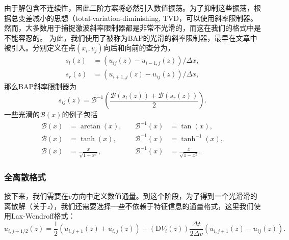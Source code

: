 由于解包含不连续性，因此二阶方案将必然引入数值振荡。为了抑制这些振荡，根据总变差减小的思想（total-variation-diminishing, TVD，可以使用斜率限制器。然而，大多数用于捕捉激波斜率限制器都是非常不光滑的，而这在我们的格式中是不能容忍的。 为此，我们使用了被称为BAP的光滑的斜率限制器，最早在文章中被引入。分别定义在点$(x_i,v_j)$向后和向前的查分为，
\begin{equation}
\begin{aligned}
  s_l(z) &= (u_{ij}(z)-u_{i-1,j}(z))/\Delta x, \\
  s_r(z) &= (u_{i+1,j}(z)-u_{ij}(z))/\Delta x,
\end{aligned}
\end{equation}
那么BAP斜率限制器为
\begin{equation}
  s_{ij}(z)=\mathcal{B}^{-1}\left(\frac{\mathcal{B}(s_l(z))+\mathcal{B}(s_r(z))}{2}\right).
\end{equation}
一些光滑的$\mathcal{B}(x)$的例子包括
\begin{equation}
  \begin{aligned}
    \mathcal{B}(x)&=\arctan(x), \quad&\mathcal{B}^{-1}(x)&=\tan(x), \\
    \mathcal{B}(x)&=\tanh(x), \quad& \mathcal{B}^{-1}(x)&=\tanh^{-1}(x), \\
    \mathcal{B}(x)&=\frac{x}{\sqrt{1+x^2}}, \quad& \mathcal{B}^{-1}(x)&=\frac{x}{\sqrt{1-x^2}}.
  \end{aligned}
\end{equation}

\subsubsection{全离散格式}

接下来，我们需要在$v$方向中定义数值通量。到这个阶段，为了得到一个光滑滑的离散解（关于$z$），我们还需要选择一些不依赖于特征信息的通量格式，这里我们使用Lax-Wendroff格式：
\begin{equation} \label{vflux}
u_{i,j+1/2}(z) = \frac{1}{2}(u_{i,j+1}(z)+u_{i,j}(z))
  + (\mathrm{D}V_i(z))\frac{\Delta t}{2\Delta v}(u_{i,j+1}(z)-u_{ij}(z)).
\end{equation}

